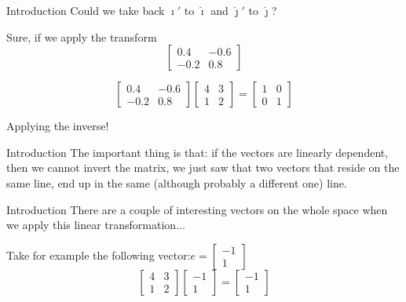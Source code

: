 \documentclass[aspectratio=169]{beamer}
\begin{document}
\begin{frame}{Introduction}
    Could we take back $\hat{\imath}'$ to $\hat{\imath}$ and $\hat{\jmath}'$ to $\hat{\jmath}$? \pause
    
    Sure, if we apply the transform \[\begin{bmatrix}0.4&-0.6\\-0.2&0.8\end{bmatrix}\] \pause
    
    \[\begin{bmatrix}0.4&-0.6\\-0.2&0.8\end{bmatrix}\begin{bmatrix}4&3\\1&2\end{bmatrix}=\begin{bmatrix}1&0\\0&1\end{bmatrix}\]
    
    Applying the inverse!
\end{frame}

\begin{frame}{Introduction}
    The important thing is that: if the vectors are linearly dependent, then we cannot invert the matrix, we just saw that two vectors that reside on the same line, end up in the same (although probably a different one) line.
\end{frame}

\begin{frame}{Introduction}
    There are a couple of interesting vectors on the whole space when we apply this linear transformation...
    
    Take for example the following vector:\(e=\begin{bmatrix}-1\\1\end{bmatrix}\)\pause
    \[\begin{bmatrix}4&3\\1&2\end{bmatrix}\begin{bmatrix}-1\\1\end{bmatrix}=\begin{bmatrix}-1\\1\end{bmatrix}\]
\end{frame}
\end{document}
